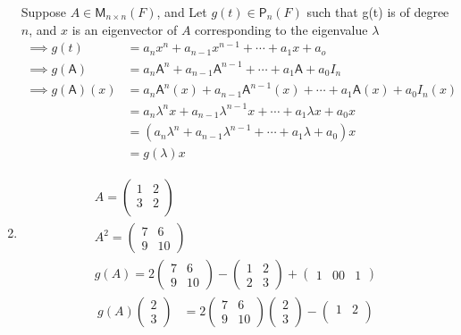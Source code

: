 \begin{enumerate}
Suppose $A \in \mathsf{M}_{n\times n}(F)$, and Let $g(t) \in
\mathsf{P}_n(F)$ such that g(t) is of degree $n$, and $x$ is an
eigenvector of $A$ corresponding to the eigenvalue $\lambda$
\begin{align}
\implies g(t) &= a_nx^n +a_{n-1}x^{n-1} +\dotsb+ a_1x + a_o\\
\implies g(\mathsf{A}) &= a_n\mathsf{A}^n + a_{n-1}\mathsf{A}^{n-1}
+\dotsb + a_1\mathsf{A} +a_0I_n\\
\implies g(\mathsf{A}) (x)&= a_n\mathsf{A}^n(x) + a_{n-1}\mathsf{A}^{n-1}(x)
+\dotsb + a_1\mathsf{A}(x) +a_0I_n(x)\\
&=a_n\lambda^nx +a_{n-1}\lambda^{n-1}x +\dotsb +a_1\lambda x+ a_0x\\
&=(a_n\lambda^n +a_{n-1}\lambda^{n-1} +\dotsb +a_1\lambda + a_0)x\\
&=g(\lambda)x
\end{align}
\item 
\begin{gather}
A  = \begin{pmatrix}
1 & 2\\
3 & 2\\
\end{pmatrix}\\
A^2 =\begin{pmatrix}
7 & 6\\
9 & 10
\end{pmatrix}\\
g(A) = 2\begin{pmatrix}
7 & 6 \\
9 & 10
\end{pmatrix}
-\begin{pmatrix}
1 & 2 \\
2 & 3
\end{pmatrix}
+
\begin{pmatrix}
1 & 0
0 & 1
\end{pmatrix}
\end{gather}
\begin{align}
g(A)\begin{pmatrix}2\\3\end{pmatrix} &= 2\begin{pmatrix}
7 & 6 \\
9 & 10
\end{pmatrix}\begin{pmatrix}2\\3\end{pmatrix}
-\begin{pmatrix}
1 & 2 \\

\end{pmatrix}
\end{align}
\end{enumerate}
